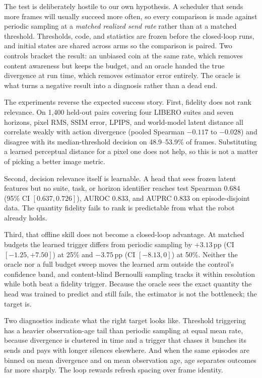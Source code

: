 \documentclass[sigconf,10pt,anonymous,review]{acmart}
\newcommand{\pp}{\,pp}
\begin{document}
The test is deliberately hostile to our own hypothesis. A scheduler that
sends more frames will usually succeed more often, so every comparison is
made against periodic sampling at a \emph{matched realized send rate} rather
than at a matched threshold. Thresholds, code, and statistics are frozen
before the closed-loop runs, and initial states are shared across arms so the
comparison is paired. Two controls bracket the result: an unbiased coin at
the same rate, which removes content awareness but keeps the budget, and an
oracle handed the true divergence at run time, which removes estimator error
entirely. The oracle is what turns a negative result into a diagnosis rather than a
dead end.

The experiments reverse the expected success story. First, fidelity does not
rank relevance. On 1{,}400 held-out pairs covering four LIBERO suites and
seven horizons, pixel RMS, SSIM error, LPIPS, and world-model latent distance
all correlate weakly with action divergence (pooled Spearman $-0.117$ to
$-0.028$) and disagree with its median-threshold decision on 48.9--53.9\% of
frames. Substituting a learned perceptual distance for a pixel one does not
help, so this is not a matter of picking a better image metric.

Second, decision relevance itself is learnable. A head that sees frozen
latent features but no suite, task, or horizon identifier reaches test
Spearman $0.684$ (95\% CI $[0.637, 0.726]$), AUROC $0.833$, and AUPRC $0.833$
on episode-disjoint data. The quantity fidelity fails to rank is predictable
from what the robot already holds.

Third, that offline skill does not become a closed-loop advantage. At matched
budgets the learned trigger differs from periodic sampling by $+3.13$\pp{}
(CI $[-1.25, +7.50]$) at 25\% and $-3.75$\pp{} (CI $[-8.13, 0]$) at 50\%.
Neither the oracle nor a full budget sweep moves the learned arm outside the
control's confidence band, and content-blind Bernoulli sampling
tracks it within resolution while both beat a fidelity trigger. Because the
oracle sees the exact quantity the head was trained to predict and still
fails, the estimator is not the bottleneck; the target is.

Two diagnostics indicate what the right target looks like. Threshold
triggering has a heavier observation-age tail than periodic sampling at equal
mean rate, because divergence is clustered in time and a trigger that chases
it bunches its sends and pays with longer silences elsewhere. And when the
same episodes are binned on mean divergence and on mean observation age, age
separates outcomes far more sharply. The loop rewards refresh spacing over
frame identity.
\end{document}
